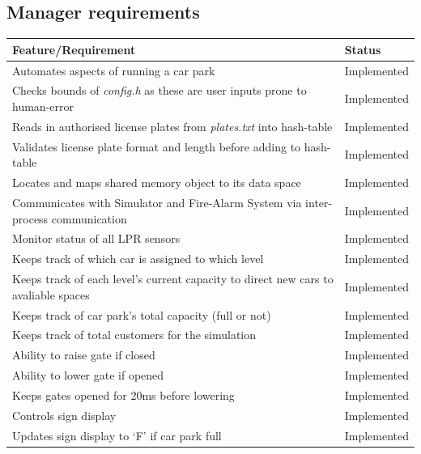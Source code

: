 \documentclass[a4paper]{article}
\begin{document}
\subsection{Manager requirements}
\begin{tabular}{|m{24.7em}|l|}
  \hline
  \cellcolor{gray!10} \textbf{Feature\slash Requirement} & \cellcolor{gray!10} \textbf{Status}\\
  \hline
  Automates aspects of running a car park & \cellcolor{green!40}Implemented\\
  \hline
  Checks bounds of \emph{config.h} as these are user inputs prone to human-error & \cellcolor{green!40}Implemented\\
  \hline
  Reads in authorised license plates from \emph{plates.txt} into hash-table & \cellcolor{green!40}Implemented\\
  \hline
  Validates license plate format and length before adding to hash-table & \cellcolor{green!40}Implemented\\
  \hline
  Locates and maps shared memory object to its data space & \cellcolor{green!40}Implemented\\
  \hline
  Communicates with Simulator and Fire-Alarm System via inter-process communication & \cellcolor{green!40}Implemented\\
  \hline
  Monitor status of all LPR sensors & \cellcolor{green!40}Implemented\\
  \hline
  Keeps track of which car is assigned to which level & \cellcolor{green!40}Implemented\\
  \hline
  Keeps track of each level’s current capacity to direct new cars to avaliable spaces & \cellcolor{green!40}Implemented\\
  \hline
  Keeps track of car park’s total capacity (full or not) & \cellcolor{green!40}Implemented\\
  \hline
  Keeps track of total customers for the simulation & \cellcolor{green!40}Implemented\\
  \hline
  Ability to raise gate if closed & \cellcolor{green!40}Implemented\\
  \hline
  Ability to lower gate if opened & \cellcolor{green!40}Implemented\\
  \hline
  Keeps gates opened for 20ms before lowering & \cellcolor{green!40}Implemented\\
  \hline
  Controls sign display & \cellcolor{green!40}Implemented\\
  \hline
  Updates sign display to ‘F’ if car park full & \cellcolor{green!40}Implemented\\
  \hline
\end{tabular}
\end{document}
